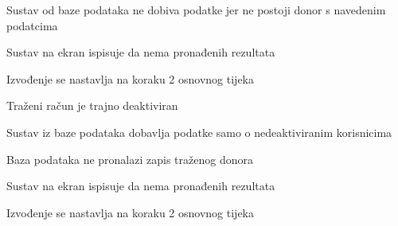 \begin{packed_item}
\begin{packed_item}
							\item[3.1] Sustav od baze podataka ne dobiva podatke jer ne postoji donor s navedenim podatcima
							\item[] \begin{packed_enum}
								\item Sustav na ekran ispisuje da nema pronađenih rezultata
								\item Izvođenje se nastavlja na koraku 2 osnovnog tijeka
							\end{packed_enum}
							\item[3.2] Traženi račun je trajno deaktiviran
							\item[] \begin{packed_enum}
								\item Sustav iz baze podataka dobavlja podatke samo o nedeaktiviranim korisnicima
								\item Baza podataka ne pronalazi zapis traženog donora
								\item Sustav na ekran ispisuje da nema pronađenih rezultata
								\item Izvođenje se nastavlja na koraku 2 osnovnog tijeka
							\end{packed_enum}
							
						\end{packed_item}
						
					\end{packed_item}
					
